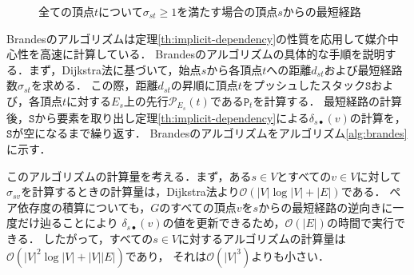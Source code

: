 \begin{figure}[tb]
  \centering
  \def\svgwidth{.35\linewidth}
  
  \caption{全ての頂点$t$について$\sigma_{st}\geq1$を満たす場合の頂点$s$からの最短経路}
  \label{fig:implicit-dependency-2}
\end{figure}

Brandesのアルゴリズムは定理\ref{th:implicit-dependency}の性質を応用して媒介中心性を高速に計算している．
Brandesのアルゴリズムの具体的な手順を説明する．まず，Dijkstra法に基づいて，始点$s$から各頂点$t$への距離$d_{st}$および最短経路数$\sigma_{st}$を求める．
この際，距離$d_{st}$の昇順に頂点$t$をプッシュしたスタック$\texttt{S}$および，各頂点$t$に対する$E_{s}$上の先行$\mathcal{P}_{E_s}(t)$である$\texttt{P}_t$を計算する．
最短経路の計算後，$\texttt{S}$から要素を取り出し定理\ref{th:implicit-dependency}による$\delta_{s\bullet}(v)$の計算を，$\texttt{S}$が空になるまで繰り返す．
Brandesのアルゴリズムをアルゴリズム\ref{alg:brandes}に示す．

このアルゴリズムの計算量を考える．まず，ある$s\in V$とすべての$v\in V$に対して
$\sigma_{sv}$を計算するときの計算量は，Dijkstra法より$\mathcal{O}(|V|\log |V|+|E|)$である．
ペア依存度の積算についても，$G$のすべての頂点$v$を$s$からの最短経路の逆向きに一度だけ辿ることにより
$\delta_{s\bullet}(v)$の値を更新できるため，$\mathcal{O}(|E|)$の時間で実行できる\cite{Brandes2001}．
したがって，すべての$s\in V$に対するアルゴリズムの計算量は$\mathcal{O}(|V|^2\log |V|+|V||E|)$であり，
それは$\mathcal{O}(|V|^3)$よりも小さい．

